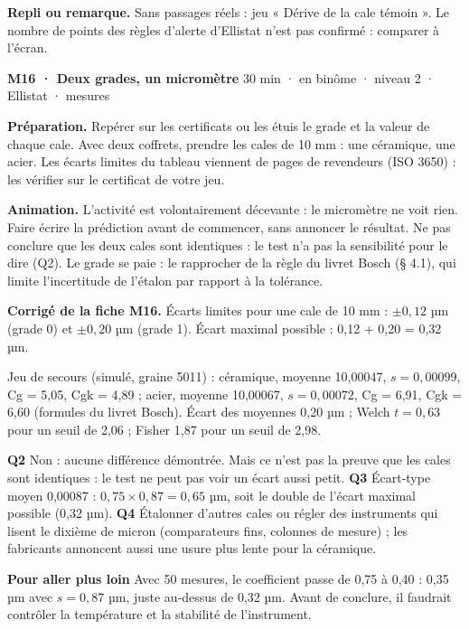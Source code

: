 {\small\textbf{Repli ou remarque.} Sans passages réels : jeu « Dérive de la cale témoin ». Le nombre de points des règles d'alerte d'Ellistat n'est pas confirmé : comparer à l'écran.}\par
\vspace{3pt}
\begin{tcolorbox}[act]\textbf{M16 · Deux grades, un micromètre} \hfill {\small 30 min · en binôme · niveau 2 · Ellistat · mesures}\end{tcolorbox}
\textbf{Préparation.} Repérer sur les certificats ou les étuis le grade et la valeur de chaque cale. Avec deux coffrets, prendre les cales de 10 mm : une céramique, une acier. Les écarts limites du tableau viennent de pages de revendeurs (ISO 3650) : les vérifier sur le certificat de votre jeu.\par
\textbf{Animation.} L'activité est volontairement décevante : le micromètre ne voit rien. Faire écrire la prédiction avant de commencer, sans annoncer le résultat. Ne pas conclure que les deux cales sont identiques : le test n'a pas la sensibilité pour le dire (Q2). Le grade se paie : le rapprocher de la règle du livret Bosch (§ 4.1), qui limite l'incertitude de l'étalon par rapport à la tolérance.\par
\textbf{\color{ok}Corrigé de la fiche M16.} Écarts limites pour une cale de 10 mm : $\pm 0{,}12$ µm (grade 0) et $\pm 0{,}20$ µm (grade 1). Écart maximal possible : 0,12 + 0,20 = 0,32 µm.\par Jeu de secours (simulé, graine 5011) : céramique, moyenne 10,00047, $s = 0{,}00099$, Cg = 5,05, Cgk = 4,89 ; acier, moyenne 10,00067, $s = 0{,}00072$, Cg = 6,91, Cgk = 6,60 (formules du livret Bosch). Écart des moyennes 0,20 µm ; Welch $t = 0{,}63$ pour un seuil de 2,06 ; Fisher 1,87 pour un seuil de 2,98.\par \textbf{Q2} Non : aucune différence démontrée. Mais ce n'est pas la preuve que les cales sont identiques : le test ne peut pas voir un écart aussi petit. \textbf{Q3} Écart-type moyen 0,00087 : $0{,}75 \times 0{,}87 = 0{,}65$ µm, soit le double de l'écart maximal possible (0,32 µm). \textbf{Q4} Étalonner d'autres cales ou régler des instruments qui lisent le dixième de micron (comparateurs fins, colonnes de mesure) ; les fabricants annoncent aussi une usure plus lente pour la céramique.\par \textbf{Pour aller plus loin} Avec 50 mesures, le coefficient passe de 0,75 à 0,40 : 0,35 µm avec $s = 0{,}87$ µm, juste au-dessus de 0,32 µm. Avant de conclure, il faudrait contrôler la température et la stabilité de l'instrument.\par

